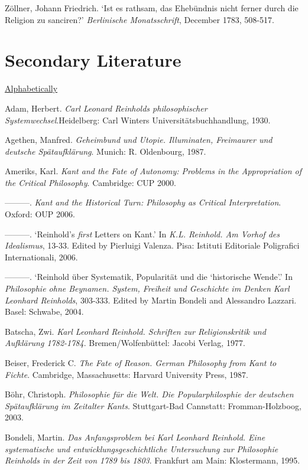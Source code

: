 Z\"{o}llner, Johann Friedrich. `Ist es rathsam, das Eheb\"{u}ndnis nicht ferner durch die Religion zu sanciren?' \textit{Berlinische Monatsschrift}, December 1783, 508{-}517.


\section{Secondary Literature}


\ul{Alphabetically}

Adam, Herbert. \textit{Carl Leonard Reinholds philosophischer Systemwechsel}.Heidelberg: Carl Winters Universit\"{a}tsbuchhandlung, 1930.

Agethen, Manfred. \textit{Geheimbund und Utopie. Illuminaten, Freimaurer und deutsche Sp\"{a}taufkl\"{a}rung}. Munich: R. Oldenbourg, 1987.

Ameriks, Karl. \textit{Kant and the Fate of Autonomy: Problems in the Appropriation of the Critical Philosophy}. Cambridge: CUP 2000.

{---}{---}{---}. \textit{Kant and the Historical Turn: Philosophy as Critical Interpretation}. Oxford: OUP 2006.

{---}{---}{---}. `Reinhold's \textit{first }Letters on Kant.' In \textit{K.L. Reinhold. Am Vorhof des Idealismus}, 13{-}33. Edited by Pierluigi Valenza. Pisa: Istituti Editoriale Poligrafici Internationali, 2006.

{---}{---}{---}. `Reinhold \"{u}ber Systematik, Popularit\"{a}t und die `historische Wende'.' In\textit{ Philosophie ohne Beynamen. System, Freiheit und Geschichte im Denken Karl Leonhard Reinholds}, 303{-}333. Edited by Martin Bondeli and Alessandro Lazzari. Basel: Schwabe, 2004.

Batscha, Zwi. \textit{Karl Leonhard Reinhold. Schriften zur Religionskritik und Aufkl\"{a}rung 1782{-}1784}. Bremen/Wolfenb\"{u}ttel: Jacobi Verlag, 1977.

Beiser, Frederick C. \textit{The Fate of Reason. German Philosophy from Kant to Fichte}. Cambridge, Massachusetts: Harvard University Press, 1987.

B\"{o}hr, Christoph. \textit{Philosophie f\"{u}r die Welt. Die Popularphilosphie der deutschen Sp\"{a}taufkl\"{a}rung im Zeitalter Kants}. Stuttgart{-}Bad Cannstatt: Fromman{-}Holzboog, 2003.

Bondeli, Martin. \textit{Das Anfangsproblem bei Karl Leonhard Reinhold. Eine systematische und entwicklungsgeschichtliche Untersuchung zur Philosophie Reinholds in der Zeit von 1789 bis 1803}. Frankfurt am Main: Klostermann, 1995.

